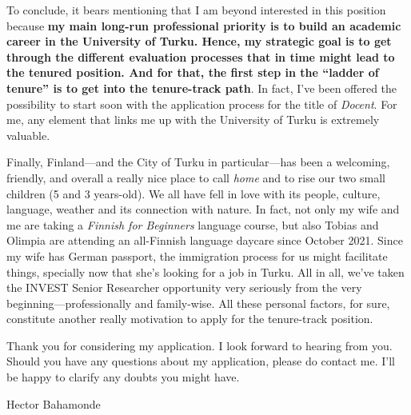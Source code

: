 \documentclass[10pt,stdletter,dateno,sigleft]{newlfm} %
\begin{document}
\begin{newlfm}
To conclude, it bears mentioning that I am beyond interested in this position because {\bf my main long-run professional priority is to build an academic career in the University of Turku.  Hence, my strategic goal is to get through the different evaluation processes that in time might lead to the tenured position. And for that, the first step in the ``ladder of tenure'' is to get into the tenure-track path}. In fact, I've been offered the possibility to start soon with the application process for the title of \emph{Docent}. For me, any element that links me up with the University of Turku is extremely valuable. 

Finally, Finland---and the City of Turku in particular---has been a welcoming, friendly, and overall a really nice place to call \emph{home} and to rise our two small children (5 and 3 years-old). We all have fell in love with its people, culture, language, weather and its connection with nature. In fact, not only my wife and me are taking a \emph{Finnish for Beginners} language course, but also Tobias and Olimpia are attending an all-Finnish language daycare since October 2021. Since my wife has German passport, the immigration process for us might facilitate things, specially now that she's looking for a job in Turku. All in all, we've taken the INVEST Senior Researcher  opportunity very seriously from the very beginning---professionally and family-wise. All these personal factors, for sure, constitute another really motivation to apply for the tenure-track position. 

Thank you for considering my application. I look forward to hearing from you. Should you have any questions about my application, please do contact me. I'll be happy to clarify any doubts you might have.




\vspace{7cm}

{\hspace{12cm}Hector Bahamonde}



\end{newlfm}
\end{document}
